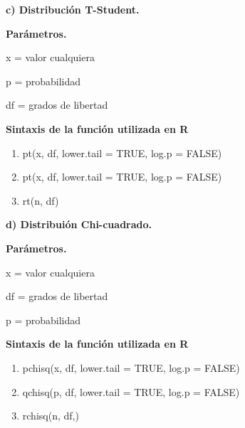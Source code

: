 \documentclass[12pt,letterpaper]{article}\usepackage[]{graphicx}\usepackage[]{color}
\begin{document}
\begin{description}
  \item \textbf{c) Distribuci\'on T-Student.}
\end{description}
\begin{itemize}
  \item \textbf{Par\'ametros.}
  \begin{center}
\item x = valor cualquiera
\item p = probabilidad
\item df = grados de libertad  
\end{center}
\item \textbf{Sintaxis de la funci\'on utilizada en R}
\begin{enumerate}
  \item pt(x, df, lower.tail = TRUE, log.p = FALSE)
  \item pt(x, df, lower.tail = TRUE, log.p = FALSE) 
  \item rt(n, df)   
\end{enumerate}
\end{itemize}

\begin{description}
  \item \textbf{d) Distribui\'on Chi-cuadrado.}
\end{description}
\begin{itemize}
  \item \textbf{Par\'ametros.}
  \begin{center}
\item x = valor cualquiera
\item df = grados de libertad
\item p = probabilidad 
\end{center}
\item \textbf{Sintaxis de la funci\'on utilizada en R}
\begin{enumerate}
  \item pchisq(x, df, lower.tail = TRUE, log.p = FALSE)
  \item qchisq(p, df, lower.tail = TRUE, log.p = FALSE)
  \item rchisq(n, df,)    
\end{enumerate}
\end{itemize}
\end{document}
